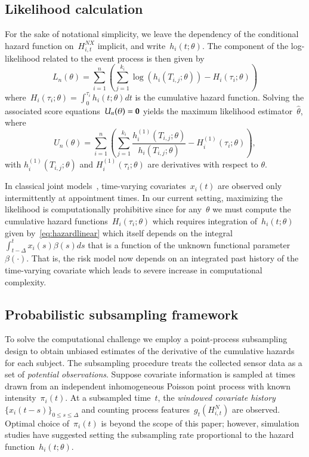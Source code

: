 \documentclass[12pt]{amsart}
\begin{document}
\subsection{Likelihood calculation}

For the sake of notational simplicity, we leave the dependency of the conditional hazard function on~$H_{i,t}^{NX}$ implicit, and write~$h_i (t; \theta)$. The component of the log-likelihood related to the event process is then given by
\[
  L_n (\theta) = \sum_{i=1}^{n} \left ( \sum_{j=1}^{k_i}
    \log \left( h_i \left( T_{i,j}; \theta
      \right) \right) - H_{i} \left( \tau_i; \theta \right) \right)
\]
where~$H_{i} (\tau_i ; \theta) = \int_{0}^{\tau_i} h_{i} (t; \theta) dt$ is the cumulative hazard function. Solving the associated score equations~$U_n (\theta) = {\bf 0}$ yields the maximum likelihood estimator~$\hat \theta$, where
\[
U_n (\theta) = \sum_{i=1}^{n} \left ( \sum_{j=1}^{k_i} \frac{h^{(1)}_i
    (T_{i,j}; \theta)}{h_i (T_{i,j}; \theta)} - H^{(1)}_{i} (\tau_i;
  \theta) \right),
\]
with $h_i^{(1)} (T_{i,j}; \theta)$ and $H_i^{(1)} (\tau_{i}; \theta)$ are derivatives with respect to $\theta$.

In classical joint models~\citep{Henderson2000, Tsiatis2004}, time-varying covariates~$x_i (t)$ are observed only intermittently at appointment times. In our current setting, maximizing the likelihood is computationally prohibitive since for any~$\theta$ we must compute the cumulative hazard functions~$H_{i} (\tau_i; \theta)$ which requires integration of~$h_i(t;\theta)$ given by~\eqref{eq:hazardlinear} which itself depends on the integral~$\int_{t-\Delta}^t x_i (s) \beta(s) ds$ that is a function of the unknown functional parameter $\beta(\cdot)$.  That is, the risk model now depends on an integrated past history of the time-varying covariate which leads to severe increase in computational complexity.

\subsection{Probabilistic subsampling framework}

To solve the computational challenge we employ a point-process subsampling design to obtain unbiased estimates of the derivative of the cumulative hazards for each subject. The subsampling procedure treats the collected sensor data as a set of \emph{potential observations}. Suppose covariate information is sampled at times drawn from an independent inhomogeneous Poisson point process with known intensity~$\pi_i (t)$. At a subsampled time~$t$, the \emph{windowed covariate history} $\{ x_i (t-s)\}_{0 \leq s \leq \Delta}$ and counting process features~$g_t (H_{i,t}^N)$ are observed. Optimal choice of~$\pi_i (t)$ is beyond the scope of this paper; however, simulation studies have suggested setting the subsampling rate proportional to the hazard function~$h_i (t; \theta)$.
\end{document}
